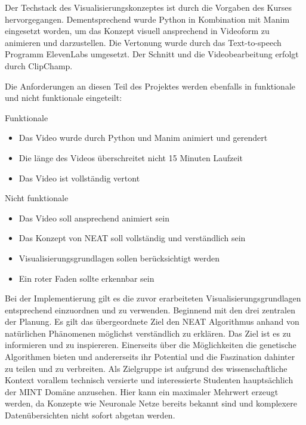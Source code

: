 Der Techstack des Visualisierungskonzeptes ist durch die Vorgaben des Kurses hervorgegangen. Dementsprechend wurde Python in Kombination mit Manim eingesetzt worden, um das Konzept visuell ansprechend in Videoform zu animieren und darzustellen. Die Vertonung wurde durch das Text-to-speech Programm ElevenLabs umgesetzt. Der Schnitt und die Videobearbeitung erfolgt durch ClipChamp. 

Die Anforderungen an diesen Teil des Projektes werden ebenfalls in funktionale und nicht funktionale eingeteilt:  

Funktionale 
\begin{itemize}

	\item Das Video wurde durch Python und Manim animiert und gerendert 
	\item Die länge des Videos überschreitet nicht 15 Minuten Laufzeit
	\item Das Video ist vollständig vertont
	
\end{itemize}

Nicht funktionale
\begin{itemize}

	\item Das Video soll ansprechend animiert sein
	\item Das Konzept von NEAT soll vollständig und verständlich sein
	\item Visualisierungsgrundlagen sollen berücksichtigt werden
	\item Ein roter Faden sollte erkennbar sein

\end{itemize}

Bei der Implementierung gilt es die zuvor erarbeiteten Visualisierungsgrundlagen entsprechend einzuordnen und zu verwenden. Beginnend mit den drei zentralen der Planung. Es gilt das übergeordnete Ziel den NEAT Algorithmus anhand von natürlichen Phänomenen möglichst verständlich zu erklären. Das Ziel ist es zu informieren und zu inspiereren. Einerseits über die Möglichkeiten die genetische Algorithmen bieten und andererseits ihr Potential und die Faszination dahinter zu teilen und zu verbreiten. Als Zielgruppe ist aufgrund des wissenschaftliche Kontext vorallem technisch versierte und interessierte Studenten hauptsächlich der MINT Domäne anzusehen. Hier kann ein maximaler Mehrwert erzeugt werden, da Konzepte wie Neuronale Netze bereits bekannt sind und komplexere Datenübersichten nicht sofort abgetan werden. 

